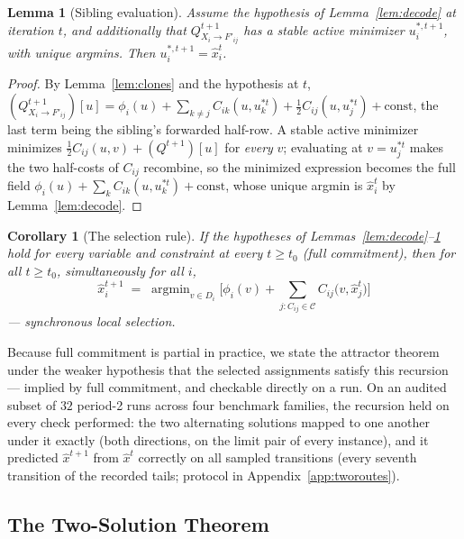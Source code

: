 \documentclass[letterpaper]{article} %
\newtheorem{lemma}[theorem]{Lemma}
\newtheorem{corollary}[theorem]{Corollary}
\theoremstyle{definition}
\theoremstyle{remark}
\begin{document}
\begin{lemma}[Sibling evaluation]\label{lem:sibling}
Assume the hypothesis of Lemma~\ref{lem:decode} at iteration $t$, and
additionally that $Q^{t+1}_{X_i \to F'_{ij}}$ has a stable active
minimizer $u^{*,t+1}_i$, with unique argmins.  Then
$u^{*,t+1}_i = \hat{x}^{t}_i$.
\end{lemma}
\begin{proof}
By Lemma~\ref{lem:clones} and the hypothesis at $t$,
$(Q^{t+1}_{X_i \to F'_{ij}})[u] = \phi_i(u) + \sum_{k \neq j}
C_{ik}(u, u^{*t}_k) + \tfrac12 C_{ij}(u, u^{*t}_j) + \text{const}$, the
last term being the sibling's forwarded half-row.  A stable active
minimizer minimizes $\tfrac12 C_{ij}(u,v) + (Q^{t+1})[u]$ for
\emph{every} $v$; evaluating at $v = u^{*t}_j$ makes the two half-costs
of $C_{ij}$ recombine, so the minimized expression becomes the full field
$\phi_i(u) + \sum_{k} C_{ik}(u, u^{*t}_k) + \text{const}$, whose unique
argmin is $\hat{x}^{t}_i$ by Lemma~\ref{lem:decode}. \qedhere
\end{proof}

\begin{corollary}[The selection rule]\label{cor:rule}
If the hypotheses of Lemmas~\ref{lem:decode}--\ref{lem:sibling} hold for
every variable and constraint at every $t \ge t_0$ (\emph{full
commitment}), then for all $t \ge t_0$, simultaneously for all $i$,
\[
  \hat{x}^{t+1}_i \;=\; \operatorname{argmin}_{v\in D_i}
  \Big[\phi_i(v) + \sum_{j : C_{ij}\in\mathcal{C}}
  C_{ij}\big(v, \hat{x}^{t}_j\big)\Big]
\]
--- \emph{synchronous local selection}.
\end{corollary}

Because full commitment is partial in practice, we state the attractor
theorem under the weaker hypothesis that the selected assignments satisfy
this recursion --- implied by full commitment, and checkable directly on
a run.  On an audited subset of $32$ period-2 runs across four benchmark
families, the recursion held on every check performed: the two
alternating solutions mapped to one another under it exactly (both
directions, on the limit pair of every instance), and it predicted
$\hat{x}^{t+1}$ from $\hat{x}^{t}$ correctly on all sampled transitions
(every seventh transition of the recorded tails; protocol in
Appendix~\ref{app:tworoutes}).

\subsection{The Two-Solution Theorem}\label{sec:twosol}
\end{document}
